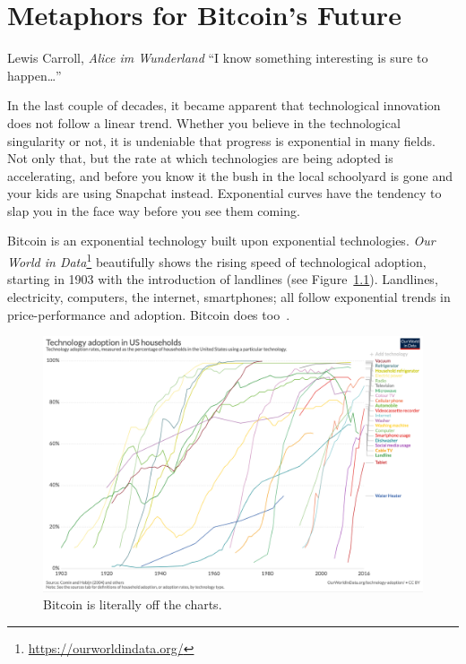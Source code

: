 \chapter{Metaphors for Bitcoin's Future}
\label{les:21}

\begin{chapquote}{Lewis Carroll, \textit{Alice im Wunderland}}
\enquote{I know something interesting is sure to happen\ldots}
\end{chapquote}

In the last couple of decades, it became apparent that technological
innovation does not follow a linear trend. Whether you believe in the
technological singularity or not, it is undeniable that progress is
exponential in many fields. Not only that, but the rate at which
technologies are being adopted is accelerating, and before you know it
the bush in the local schoolyard is gone and your kids are using
Snapchat instead. Exponential curves have the tendency to slap you in
the face way before you see them coming.

Bitcoin is an exponential technology built upon exponential technologies.
\textit{Our World in Data}\footnote{\url{https://ourworldindata.org/}}
beautifully shows the rising speed of technological adoption, starting in 1903
with the introduction of landlines (see Figure~\ref{fig:tech-adoption}).
Landlines, electricity, computers, the internet, smartphones; all follow
exponential trends in price-performance and adoption. Bitcoin does
too~\cite{tech-adoption}.

\begin{figure}
  \includegraphics{assets/images/tech-adoption.png}
  \caption{Bitcoin is literally off the charts.}
  \label{fig:tech-adoption}
\end{figure}

